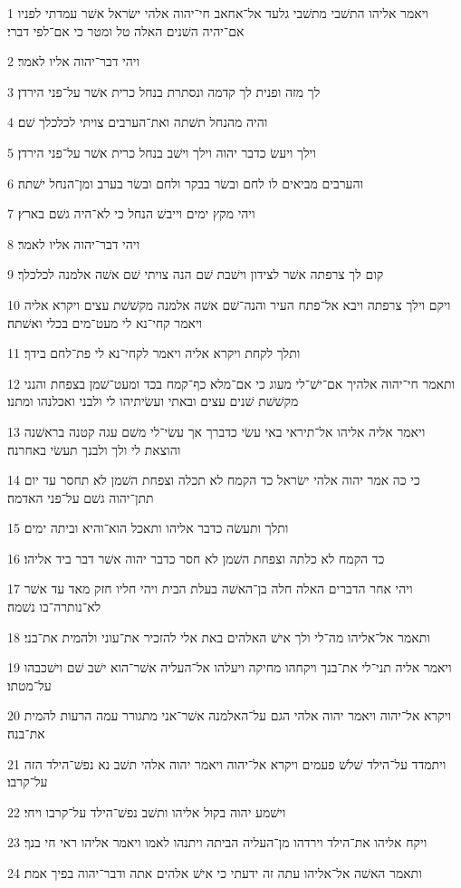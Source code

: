 \par 1 ויאמר אליהו התשׁבי מתשׁבי גלעד אל־אחאב חי־יהוה אלהי ישׂראל אשׁר עמדתי לפניו אם־יהיה השׁנים האלה טל ומטר כי אם־לפי דברי׃
\par 2 ויהי דבר־יהוה אליו לאמר׃
\par 3 לך מזה ופנית לך קדמה ונסתרת בנחל כרית אשׁר על־פני הירדן׃
\par 4 והיה מהנחל תשׁתה ואת־הערבים צויתי לכלכלך שׁם׃
\par 5 וילך ויעשׂ כדבר יהוה וילך וישׁב בנחל כרית אשׁר על־פני הירדן׃
\par 6 והערבים מביאים לו לחם ובשׂר בבקר ולחם ובשׂר בערב ומן־הנחל ישׁתה׃
\par 7 ויהי מקץ ימים וייבשׁ הנחל כי לא־היה גשׁם בארץ׃
\par 8 ויהי דבר־יהוה אליו לאמר׃
\par 9 קום לך צרפתה אשׁר לצידון וישׁבת שׁם הנה צויתי שׁם אשׁה אלמנה לכלכלך׃
\par 10 ויקם וילך צרפתה ויבא אל־פתח העיר והנה־שׁם אשׁה אלמנה מקשׁשׁת עצים ויקרא אליה ויאמר קחי־נא לי מעט־מים בכלי ואשׁתה׃
\par 11 ותלך לקחת ויקרא אליה ויאמר לקחי־נא לי פת־לחם בידך׃
\par 12 ותאמר חי־יהוה אלהיך אם־ישׁ־לי מעוג כי אם־מלא כף־קמח בכד ומעט־שׁמן בצפחת והנני מקשׁשׁת שׁנים עצים ובאתי ועשׂיתיהו לי ולבני ואכלנהו ומתנו׃
\par 13 ויאמר אליה אליהו אל־תיראי באי עשׂי כדברך אך עשׂי־לי משׁם עגה קטנה בראשׁנה והוצאת לי ולך ולבנך תעשׂי באחרנה׃
\par 14 כי כה אמר יהוה אלהי ישׂראל כד הקמח לא תכלה וצפחת השׁמן לא תחסר עד יום תתן־יהוה גשׁם על־פני האדמה׃
\par 15 ותלך ותעשׂה כדבר אליהו ותאכל הוא־והיא וביתה ימים׃
\par 16 כד הקמח לא כלתה וצפחת השׁמן לא חסר כדבר יהוה אשׁר דבר ביד אליהו׃
\par 17 ויהי אחר הדברים האלה חלה בן־האשׁה בעלת הבית ויהי חליו חזק מאד עד אשׁר לא־נותרה־בו נשׁמה׃
\par 18 ותאמר אל־אליהו מה־לי ולך אישׁ האלהים באת אלי להזכיר את־עוני ולהמית את־בני׃
\par 19 ויאמר אליה תני־לי את־בנך ויקחהו מחיקה ויעלהו אל־העליה אשׁר־הוא ישׁב שׁם וישׁכבהו על־מטתו׃
\par 20 ויקרא אל־יהוה ויאמר יהוה אלהי הגם על־האלמנה אשׁר־אני מתגורר עמה הרעות להמית את־בנה׃
\par 21 ויתמדד על־הילד שׁלשׁ פעמים ויקרא אל־יהוה ויאמר יהוה אלהי תשׁב נא נפשׁ־הילד הזה על־קרבו׃
\par 22 וישׁמע יהוה בקול אליהו ותשׁב נפשׁ־הילד על־קרבו ויחי׃
\par 23 ויקח אליהו את־הילד וירדהו מן־העליה הביתה ויתנהו לאמו ויאמר אליהו ראי חי בנך׃
\par 24 ותאמר האשׁה אל־אליהו עתה זה ידעתי כי אישׁ אלהים אתה ודבר־יהוה בפיך אמת׃

